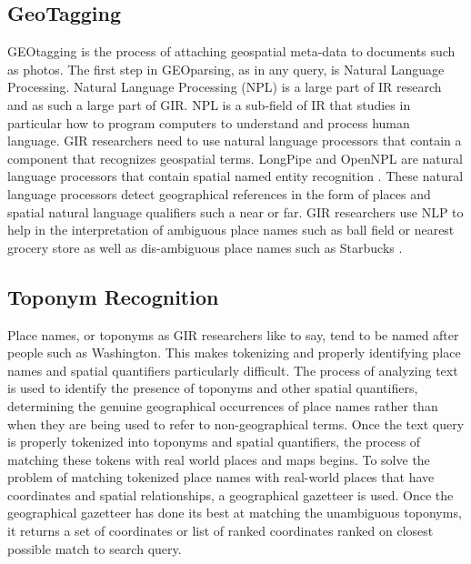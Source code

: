 \documentclass[10pt, conference, compsocconf]{IEEEtran}
\begin{document}
\subsection{GeoTagging}
GEOtagging is the process of attaching geospatial meta-data to documents such as photos. The first step in GEOparsing, as in any query, is Natural Language Processing. Natural Language Processing (NPL) is a large part of IR research and as such a large part of GIR. NPL is a sub-field of IR that studies in particular how to program computers to understand and process human language. GIR researchers need to use natural language processors that contain a component that recognizes geospatial terms. LongPipe and OpenNPL are natural language processors that contain spatial named entity recognition \cite{Page:2015fya}. These natural language processors detect geographical references in the form of places and spatial natural language qualifiers such a near or far. GIR researchers use NLP to help in the interpretation of ambiguous place names such as ball field or nearest grocery store as well as dis-ambiguous place names such as Starbucks \cite{Mountain:2007gc}. 
\subsection{Toponym Recognition}
Place names, or toponyms as GIR researchers like to say, tend to be named after people such as Washington. This makes tokenizing and properly identifying place names and spatial quantifiers particularly difficult. The process of analyzing text is used to identify the presence of toponyms and other spatial quantifiers, determining the genuine geographical occurrences of place names rather than when they are being used to refer to non-geographical terms. Once the text query is properly tokenized into toponyms and spatial quantifiers, the process of matching these tokens with real world places and maps begins. To solve the problem of matching tokenized place names with real-world places that have coordinates and spatial relationships, a geographical gazetteer is used. Once the geographical gazetteer has done its best at matching the unambiguous toponyms, it returns a set of coordinates or list of ranked coordinates ranked on closest possible match to search query. 
\end{document}
